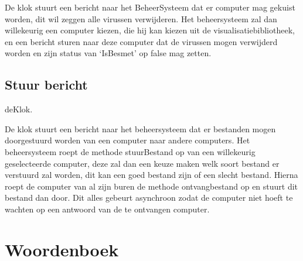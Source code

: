 \documentclass[a4paper,oneside]{report}
\begin{document}
De klok stuurt een bericht naar het BeheerSysteem dat er computer mag gekuist worden, dit wil zeggen alle virussen verwijderen. Het beheersysteem zal dan willekeurig een computer kiezen, die hij kan kiezen uit de visualisatiebibliotheek, en een bericht sturen naar deze computer dat de virussen mogen verwijderd worden en zijn status van ‘IsBesmet’ op false mag zetten.


\newpage
\subsection{Stuur bericht}
deKlok.

De klok stuurt een bericht naar het beheersysteem dat er bestanden mogen doorgestuurd worden van een computer naar andere computers. Het beheersysteem roept de methode stuurBestand op van een willekeurig geselecteerde computer, deze zal dan een keuze maken welk soort bestand er verstuurd zal worden, dit kan een goed bestand zijn of een slecht bestand. Hierna roept de computer van al zijn buren de methode ontvangbestand op en stuurt dit bestand dan door. Dit alles gebeurt asynchroon zodat de computer niet hoeft te wachten op een antwoord van de te ontvangen computer.


\newpage
\section{Woordenboek}
\end{document}
